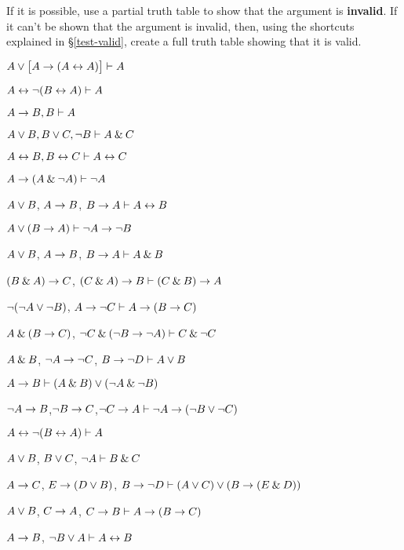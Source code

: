 \problempart
\label{pr.TT.valid4}
If it is possible, use a partial truth table to show that the argument is \textbf{invalid}. If it can't be shown that the argument is invalid, then, using the shortcuts explained in \S \ref{test-valid}, create a full truth table showing that it is valid.
\begin{earg}
\item $A\vee\bigl[A\rightarrow(A\leftrightarrow A)\bigr] \vdash A$ %
\item $A\leftrightarrow{\neg}(B\leftrightarrow A) \vdash A$ %
\item $A\rightarrow B, B \vdash A$ %
\item $A\vee B, B\vee C, {\neg} B \vdash A \mathbin{\&} C$ %
\item $A\leftrightarrow B, B\leftrightarrow C \vdash A\leftrightarrow C$ %
\item $A\rightarrow(A\mathbin{\&}{\neg} A)\vdash {\neg} A$%
\item $A \vee B$, $A \rightarrow B$, $B \rightarrow A \vdash  A \leftrightarrow B$  %
\item $A\vee(B\rightarrow A)\vdash {\neg} A \rightarrow {\neg} B$ %
\item $A \vee B$, $A \rightarrow B$, $ B \rightarrow A \vdash  A \mathbin{\&} B$ %
\item $(B\mathbin{\&} A)\rightarrow C$, $(C\mathbin{\&} A)\rightarrow B\vdash (C\mathbin{\&} B)\rightarrow A$ %
\item ${\neg} ({\neg} A \vee {\neg} B)$, $A \rightarrow {\neg} C \vdash  A \rightarrow (B \rightarrow C)$ %
\item $A \mathbin{\&} (B \rightarrow C)$, ${\neg} C \mathbin{\&} ({\neg} B \rightarrow {\neg} A)\vdash C \mathbin{\&} {\neg} C$ %
\item $A \mathbin{\&} B$, ${\neg} A \rightarrow {\neg} C$, $B \rightarrow {\neg} D \vdash  A \vee B$ %
\item $A \rightarrow B\vdash (A \mathbin{\&} B) \vee ({\neg} A \mathbin{\&} {\neg} B)$ %
\item ${\neg} A \rightarrow B$,$ {\neg} B \rightarrow C $,$ {\neg} C \rightarrow A \vdash  {\neg} A \rightarrow ({\neg} B \vee {\neg} C) $%
\item $A\leftrightarrow{\neg}(B\leftrightarrow A)\vdash A$ %
\item $A\vee B$, $B\vee C$, ${\neg} A\vdash B \mathbin{\&} C$ %
\item $A \rightarrow C$, $E \rightarrow (D \vee B)$, $B \rightarrow {\neg} D\vdash (A \vee C) \vee (B \rightarrow (E \mathbin{\&} D))$ %
\item $A \vee B$, $C \rightarrow A$, $C \rightarrow B\vdash A \rightarrow (B \rightarrow C)$ %
\item $A \rightarrow B$, ${\neg} B \vee A\vdash A \leftrightarrow B$ %
\end{earg}

